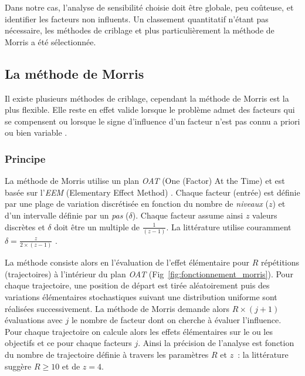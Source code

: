Dans notre cas, l’analyse de sensibilité choisie doit être globale, peu coûteuse,
et identifier les facteurs non influents. Un classement quantitatif n’étant pas
nécessaire, les méthodes de criblage et plus particulièrement la méthode de Morris
a été sélectionnée.



\subsection{La méthode de Morris} %
\label{sub:la_methode_de_morris}
Il existe plusieurs méthodes de criblage, cependant la méthode de Morris \parencite{Morris1991161}
est la plus flexible. Elle reste en effet valide lorsque le problème admet des facteurs
qui se compensent ou lorsque le signe d’influence d’un facteur n’est pas connu a priori
ou bien variable \parencite{Saltelli2004}.


\subsubsection{Principe} %
\label{ssub:principe}
La méthode de Morris utilise un plan \textit{OAT} (One (Factor) At the Time) et est basée sur
l’\textit{EEM} (Elementary Effect Method) \parencite{Saltelli2004}.
Chaque facteur (entrée) est définie par une plage de variation discrétisée en fonction
du nombre de \emph{niveaux} ($z$) et d’un intervalle définie par un \emph{pas} ($\delta$).
Chaque facteur assume ainsi $z$ valeurs discrètes et $\delta$ doit être un multiple de
$\frac{1}{(z - 1)}$. La littérature utilise couramment $\delta = \frac{z}{2 \times (z - 1)}$
\parencite{Morris1991161, Campolongo20071509}.

La méthode consiste alors en l’évaluation de l’effet élémentaire pour $R$ répétitions
(trajectoires) à l’intérieur du plan \textit{OAT} (Fig~\ref{fig:fonctionnement_morris}). Pour
chaque trajectoire, une position de départ est tirée aléatoirement puis des variations
élémentaires stochastiques suivant une distribution uniforme sont réalisées
successivement. La méthode de Morris demande alors $R \times (j + 1)$ évaluations avec $j$
le nombre de facteur dont on cherche à évaluer l’influence. Pour chaque trajectoire on
calcule alors les effets élémentaires sur le ou les objectifs et ce pour chaque facteurs
$j$. Ainsi la précision de l’analyse est fonction du nombre de trajectoire définie à
travers les paramètres $R$ et $z$~: la littérature suggère $R \geq 10$ et de $z = 4$.


